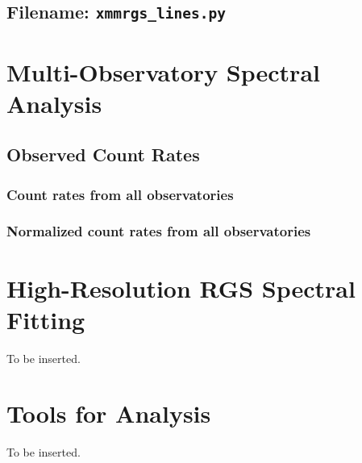     	\subsection*{Filename: \texttt{xmmrgs\_lines.py}}
    	
    	
    \section{Multi-Observatory Spectral Analysis}
    	\subsection{Observed Count Rates}
    		
    		
    		
    		
    		
    		
    		
    		
    		\subsubsection*{Count rates from all observatories}
    			
    		
    		\subsubsection*{Normalized count rates from all observatories}
    			
    	
    \section{High-Resolution RGS Spectral Fitting}
    	To be inserted.
    	
    \section{Tools for Analysis}
    	To be inserted.